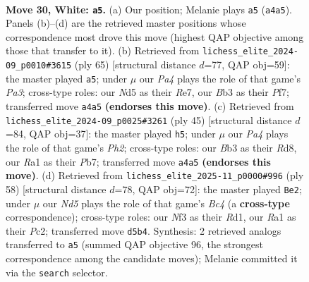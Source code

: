 \documentclass[11pt]{article}
\begin{document}
\clearpage

\begin{figure}[p]\centering
\begin{subfigure}{0.46\textwidth}\centering
\resizebox{\linewidth}{!}{%
\newchessgame
\chessboard[
  setfen={r2kr2b/2pb4/pp1n3B/3Npp2/P6R/1B3N2/1P2KPP1/R7 w - - 2 30},
  showmover=false,
  pgfstyle=straightmove, color=movearrow, markmove={a4-a5}
]}
\caption{}
\end{subfigure}\hfill
\begin{subfigure}{0.46\textwidth}\centering
\resizebox{\linewidth}{!}{%
\newchessgame
\chessboard[
  setfen={2r3k1/4rpp1/p2p2n1/2bP4/Pp2PP2/3B2P1/3B2K1/R2R4 b - - 0 33},
  showmover=false,
  pgfstyle=straightmove, color=movearrow, markmove={a6-a5}
]}
\caption{}
\end{subfigure}
\\[4pt]
\begin{subfigure}{0.46\textwidth}\centering
\resizebox{\linewidth}{!}{%
\newchessgame
\chessboard[
  setfen={3r4/1pp2k1p/5bp1/p2r4/P1n5/2P3PP/RP3P2/1NB1RK2 b - - 1 23},
  showmover=false,
  pgfstyle=straightmove, color=movearrow, markmove={h7-h5}
]}
\caption{}
\end{subfigure}\hfill
\begin{subfigure}{0.46\textwidth}\centering
\resizebox{\linewidth}{!}{%
\newchessgame
\chessboard[
  setfen={r2n4/r2bk1pp/p1p2p2/P3p3/1NB5/1R2P3/1PP3PP/3R2K1 w - - 10 30},
  showmover=false,
  pgfstyle=straightmove, color=movearrow, markmove={c4-e2}
]}
\caption{}
\end{subfigure}
\caption{\textbf{Move 30, White: \texttt{a5}.} (a) Our position; Melanie plays \texttt{a5} (\texttt{a4a5}). Panels (b)--(d) are the retrieved master positions whose correspondence most drove this move (highest QAP objective among those that transfer to it). (b) Retrieved from \texttt{lichess\_elite\_2024-09\_p0010\#3615} (ply 65) [structural distance $d$=77, QAP obj=59]: the master played \texttt{a5}; under $\mu$ our \emph{Pa4} plays the role of that game's \emph{Pa3}; cross-type roles: our \emph{N}d5 as their \emph{R}e7, our \emph{B}b3 as their \emph{P}f7; transferred move \texttt{a4a5} \textbf{(endorses this move)}. (c) Retrieved from \texttt{lichess\_elite\_2024-09\_p0025\#3261} (ply 45) [structural distance $d$=84, QAP obj=37]: the master played \texttt{h5}; under $\mu$ our \emph{Pa4} plays the role of that game's \emph{Ph2}; cross-type roles: our \emph{B}b3 as their \emph{R}d8, our \emph{R}a1 as their \emph{P}b7; transferred move \texttt{a4a5} \textbf{(endorses this move)}. (d) Retrieved from \texttt{lichess\_elite\_2025-11\_p0000\#996} (ply 58) [structural distance $d$=78, QAP obj=72]: the master played \texttt{Be2}; under $\mu$ our \emph{Nd5} plays the role of that game's \emph{Bc4} (a \textbf{cross-type} correspondence); cross-type roles: our \emph{N}f3 as their \emph{R}d1, our \emph{R}a1 as their \emph{P}c2; transferred move \texttt{d5b4}. Synthesis: 2 retrieved analogs transferred to \texttt{a5} (summed QAP objective 96, the strongest correspondence among the candidate moves); Melanie committed it via the \texttt{search} selector.}
\label{fig:thought-m58}
\end{figure}
\end{document}
